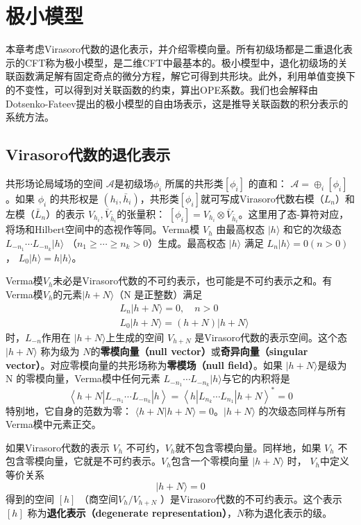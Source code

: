 \chapter{极小模型}
本章考虑Virasoro代数的退化表示，并介绍零模向量。所有初级场都是二重退化表示的CFT称为极小模型，是二维CFT中最基本的。极小模型中，退化初级场的关联函数满足解有固定奇点的微分方程，解它可得到共形块。此外，利用单值变换下的不变性，可以得到对关联函数的约束，算出OPE系数。我们也会解释由Dotsenko-Fateev提出的极小模型的自由场表示，这是推导关联函数的积分表示的系统方法。

\section{Virasoro代数的退化表示}
共形场论局域场的空间 $\mathcal{A} $是初级场$ \phi_i$ 所属的共形类$ [\phi_i]$ 的直和： $\mathcal{A}=\oplus_{i}\left[\phi_{i}\right]$ 。如果 $\phi_i$ 的共形权是 $(h_i,\bar{h}_i) $，共形类$ [\phi_i] $就可写成Virasoro代数右模（$L_n$）和左模（$\bar{L}_n$）的表示 $V_{h_{i}}, \bar{V}_{\bar{h}_{i}} $的张量积： $\left[\phi_{i}\right]=V_{h_{i}} \otimes \bar{V}_{\bar{h}_{i}} $。这里用了态-算符对应，将场和Hilbert空间中的态视作等同。Verma模 $V_h$ 由最高权态 $|h\rangle$ 和它的次级态 $L_{-n_{1}} \cdots L_{-n_{k}}|h\rangle$ （$n_{1} \geq \cdots \geq n_{k}>0$）生成。最高权态 $|h\rangle$ 满足 $L_{n}|h\rangle=0(n>0) $， $L_{0}|h\rangle=h|h\rangle $。

Verma模$ V_h $未必是Virasoro代数的不可约表示，也可能是不可约表示之和。有Verma模$V_h$的元素$|h+N\rangle$（N 是正整数）满足
\begin{align} &L_{n}|h+N\rangle=0, \quad n>0 \\ &L_{0}|h+N\rangle=(h+N)|h+N\rangle \end{align}
时，$ L_{-n} $作用在 $|h+N\rangle $上生成的空间 $V_{h+N}$ 是Virasoro代数的表示空间。这个态$ |h+N\rangle$ 称为级为 $N $的\textbf{零模向量（null vector）}或\textbf{奇异向量（singular vector）}。对应零模向量的共形场称为\textbf{零模场（null field）}。如果 $|h+N\rangle $是级为 N 的零模向量，Verma模中任何元素 $L_{-n_{1}} \cdots L_{-n_{k}}|h\rangle $与它的内积将是
\begin{equation}
	\left\langle h+N\left|L_{-n_{1}} \cdots L_{-n_{k}}\right| h\right\rangle=\left\langle h\left|L_{n_{k}} \cdots L_{n_{1}}\right| h+N\right\rangle^{*}=0
\end{equation}
特别地，它自身的范数为零： $\langle h+N | h+N\rangle=0 $。$ |h+N\rangle$ 的次级态同样与所有Verma模中元素正交。

如果Virasoro代数的表示 $V_h$ 不可约，$ V_h $就不包含零模向量。同样地，如果 $V_h$ 不包含零模向量，它就是不可约表示。$ V_h $包含一个零模向量 $|h+N\rangle$ 时， $V_h $中定义等价关系
\begin{equation}
	|h+N\rangle=0
\end{equation}
得到的空间 $[h]$ （商空间$ V_h/V_{h+N}$ ）是Virasoro代数的不可约表示。这个表示 $[h]$ 称为\textbf{退化表示（degenerate representation）}，$ N $称为退化表示的级。


